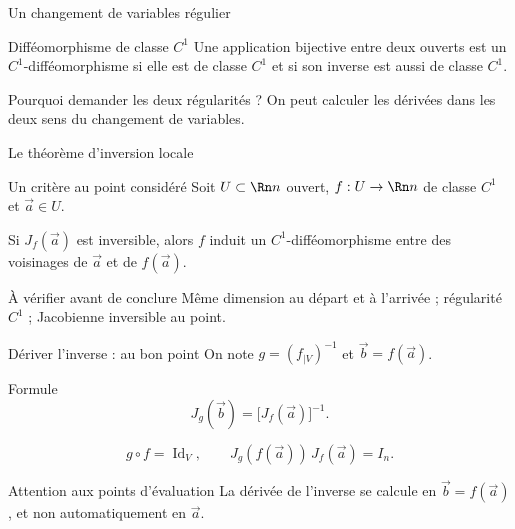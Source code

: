 \begin{frame}[t]{Un changement de variables régulier}
\coursanalyse
\begin{notion}{Difféomorphisme de classe $C^1$}
Une application bijective entre deux ouverts est un $C^1$-difféomorphisme si elle est de classe $C^1$ et si son inverse est aussi de classe $C^1$.
\end{notion}
\vfill\begin{cours}{Pourquoi demander les deux régularités ?}
On peut calculer les dérivées dans les deux sens du changement de variables.
\end{cours}
\end{frame}

\begin{frame}[t]{Le théorème d’inversion locale}
\coursanalyse
\begin{theoreme}{Un critère au point considéré}
Soit $U\subset\Rn n$ ouvert, $f:U\to\Rn n$ de classe $C^1$ et $\vec a\in U$.
\medskip\par Si $J_f(\vec a)$ est inversible, alors $f$ induit un $C^1$-difféomorphisme entre des voisinages de $\vec a$ et de $f(\vec a)$.
\end{theoreme}
\vfill\begin{resultat}{À vérifier avant de conclure}
Même dimension au départ et à l’arrivée ; régularité $C^1$ ; Jacobienne inversible au point.
\end{resultat}
\end{frame}

\begin{frame}[t]{Dériver l’inverse : au bon point}
\coursanalyse
On note $g=(f_{|V})^{-1}$ et $\vec b=f(\vec a)$.
\begin{resultat}{Formule}
\[J_g(\vec b)=\bigl[J_f(\vec a)\bigr]^{-1}.\]
\end{resultat}
\[g\circ f=\operatorname{Id}_V,\qquad J_g(f(\vec a))\,J_f(\vec a)=I_n.\]
\vfill\begin{cours}{Attention aux points d’évaluation}
La dérivée de l’inverse se calcule en $\vec b=f(\vec a)$, et non automatiquement en $\vec a$.
\end{cours}
\end{frame}

